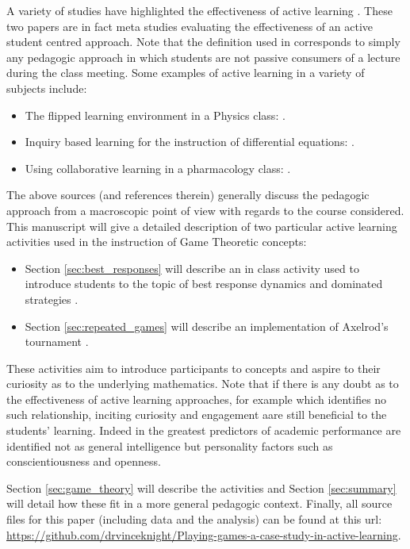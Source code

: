 \documentclass{article}
\begin{document}
A variety of studies have highlighted the effectiveness of active learning
\cite{Freeman2014, Hake1998, Prince2004}. These two papers are in fact meta
studies evaluating the effectiveness of an active student centred approach. Note
that the definition used in \cite{Freeman2014} corresponds to simply any
pedagogic approach in which students are not passive consumers of a lecture
during the class meeting. Some examples of active learning in a variety of
subjects include:

\begin{itemize}
    \item The flipped learning environment in a Physics class: \cite{Bates}.
    \item Inquiry based learning for the instruction of differential equations:
        \cite{Kwon2005}.
    \item Using collaborative learning in a pharmacology class:
        \cite{Depaz2008}.
\end{itemize}

The above sources (and references therein) generally discuss the pedagogic
approach from a macroscopic point of view with regards to the course considered.
This manuscript will give a detailed description of two particular active
learning activities used in the instruction of Game Theoretic concepts:

\begin{itemize}
    \item Section \ref{sec:best_responses} will describe an in class activity
        used to introduce students to the topic of best response dynamics and
        dominated strategies \cite{Maschler2013}.
    \item Section \ref{sec:repeated_games} will describe an implementation of
        Axelrod's tournament \cite{Axelrod1980a, Axelrod1980b}.
\end{itemize}

These activities aim to introduce participants to concepts and aspire to their
curiosity as to the underlying mathematics. Note that if there is any doubt as
to the effectiveness of active learning approaches, for example
\cite{Andrews2011} which identifies no such relationship, inciting curiosity and
engagement aare still beneficial to the students' learning.  Indeed in
\cite{Poropat2014}  the greatest predictors of academic performance are
identified not as general intelligence \cite{Wright1905} but personality factors
such as conscientiousness and openness.

Section \ref{sec:game_theory} will describe the activities and Section
\ref{sec:summary} will detail how these fit in a more general pedagogic context.
Finally, all source files for this paper (including data and the analysis) can
be found at this url:
\url{https://github.com/drvinceknight/Playing-games-a-case-study-in-active-learning}.
\end{document}

